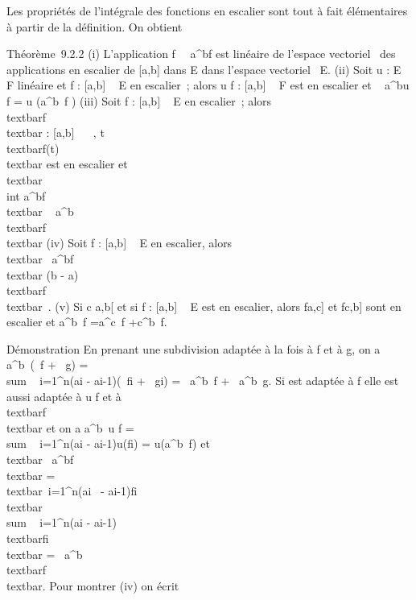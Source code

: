 Les propriétés de l'intégrale des fonctions en escalier sont tout à fait
élémentaires à partir de la définition. On obtient

Théorème~9.2.2 (i) L'application
f\mapsto~\int ~
a^bf est linéaire de l'espace vectoriel ~des applications
en escalier de {[}a,b{]} dans E dans l'espace vectoriel ~E. (ii) Soit u
: E \rightarrow~ F linéaire et f : {[}a,b{]} \rightarrow~ E en escalier~; alors u \cdot f :
{[}a,b{]} \rightarrow~ F est en escalier et \int ~
a^bu \cdot f = u\left
(\int  a^b~f\right
) (iii) Soit f : {[}a,b{]} \rightarrow~ E en escalier~; alors
\\textbar{}f\\textbar{} : {[}a,b{]} \rightarrow~ ~,
t\mapsto~\\textbar{}f(t)\\textbar{}
est en escalier et \\textbar{}\\int
 a^bf\\textbar{}
\leq\int ~
a^b\\textbar{}f\\textbar{}
(iv) Soit f : {[}a,b{]} \rightarrow~ E en escalier, alors
\\textbar{}\int ~
a^bf\\textbar{} \leq (b -
a)\\textbar{}f\\textbar{}\infty~. (v) Si c
\in{]}a,b{[} et si f : {[}a,b{]} \rightarrow~ E est en escalier, alors
f\textbar{}{[}a,c{]} et
f\textbar{}{[}c,b{]} sont en escalier et
\int  a^b~f
=\int  a^c~f
+\int  c^b~f.

Démonstration En prenant une subdivision adaptée à la fois à f et à g,
on a \int  a^b~(\alpha~f + \beta~g)
= \\sum ~
i=1^n(ai - ai-1)(\alpha~fi +
\beta~gi) = \alpha~\int  a^b~f +
\beta~\int  a^b~g. Si \sigma est adaptée à
f elle est aussi adaptée à u \cdot f et à
\\textbar{}f\\textbar{} et on a
\int  a^b~u \cdot f
= \\sum ~
i=1^n(ai - ai-1)u(fi) =
u(\int  a^b~f) et
\\textbar{}\int ~
a^bf\\textbar{}
=\\textbar{}\
\sum  i=1^n(ai~ -
ai-1)fi\\textbar{}
\leq\\sum ~
i=1^n(ai -
ai-1)\\textbar{}fi\\textbar{}
=\int ~
a^b\\textbar{}f\\textbar{}.
Pour montrer (iv) on écrit

